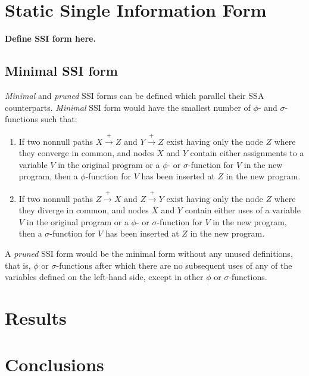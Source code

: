 \documentclass[notitlepage,twoside]{article}
\newcommand{\phifunction}{$\phi$-function}
\newcommand{\sigfunction}{$\sigma$-function}
\newcommand{\path}{\ensuremath{\rightarrow}}
\newcommand{\pathplus}{\ensuremath{\stackrel{+}{\path}}}
\begin{document}
\section{Static Single Information Form}

\textbf{Define SSI form here.}

\subsection{Minimal SSI form}
\textit{Minimal} and \textit{pruned} SSI forms can be defined which
parallel their SSA counterparts.  \textit{Minimal} SSI form would have the
smallest number of $\phi$- and \sigfunction{s} such that:
\begin{enumerate}
\item If two nonnull paths $X \pathplus Z$ and $Y \pathplus Z$
exist having only the node $Z$ where they converge in common,
and nodes $X$ and $Y$ contain either assignments to a variable $V$ in the
original program or a $\phi$- or \sigfunction{} for $V$ in the new program,
then a \phifunction{} for $V$ has been inserted at $Z$ in the new program.
\item If two nonnull paths $Z \pathplus X$ and $Z \pathplus Y$
exist having only the node $Z$ where they diverge in common,
and nodes $X$ and $Y$ contain either uses of a variable $V$ in the
original program or a $\phi$- or \sigfunction{} for $V$ in the new program,
then a \sigfunction{} for $V$ has been inserted at $Z$ in the new program.
\end{enumerate}

A \textit{pruned} SSI form would be the minimal form without any unused
definitions, that is, $\phi$ or \sigfunction{s} after which there are no
subsequent uses of any of the variables defined on the left-hand side,
except in other $\phi$ or \sigfunction{s}.

\section{Results}
\section{Conclusions}


\appendix
\end{document}

